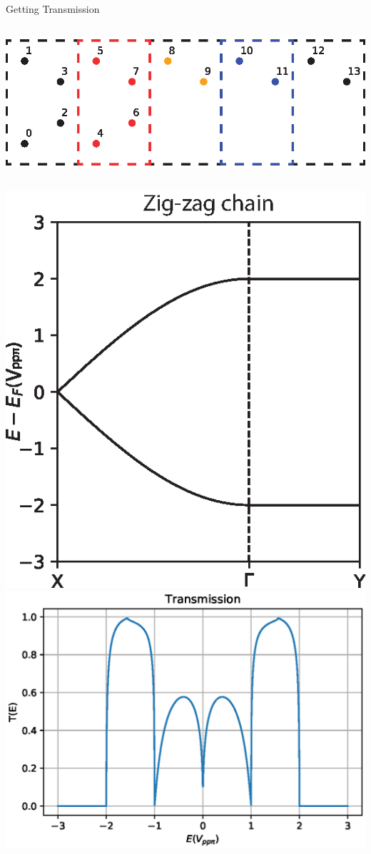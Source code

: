 \documentclass[hyperref={colorlinks=true,urlcolor=blue,linkcolor=.},aspectratio=1610,mathserif]{beamer}
\begin{document}
\begin{frame}{Getting Transmission}
\begin{overprint}
\begin{columns}[c]
			\includegraphics[width=.8\textwidth]{Figures/BetaStruct.eps}
		\end{columns}
		\vspace{-1cm}
		\begin{columns}[c]
			\includegraphics[width=.75\textwidth]{Figures/Beta2.eps}
			\includegraphics[width=.8\textwidth]{Figures/BetaTE.eps}
		\end{columns}
	\end{overprint}
\end{frame}
\end{document}
